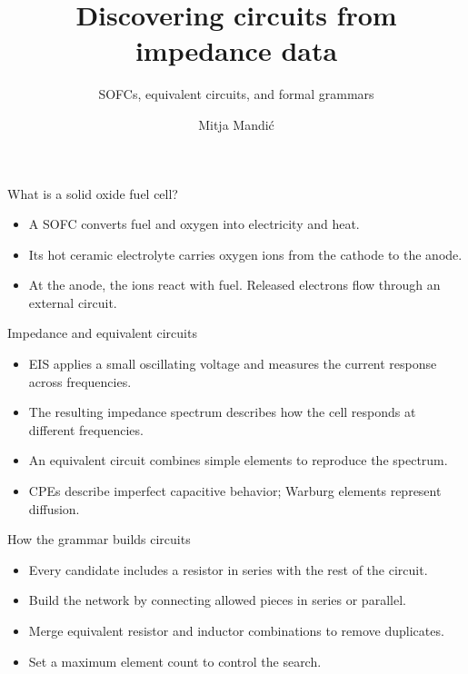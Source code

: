 \documentclass[aspectratio=169,12pt]{beamer}
\title{Discovering circuits from impedance data}
\subtitle{SOFCs, equivalent circuits, and formal grammars}
\author{Mitja Mandić}
\institute{IJS E8}
\date{}
\begin{document}
\begin{frame}[plain]
  \titlepage
\end{frame}

\begin{frame}{What is a solid oxide fuel cell?}
  \begin{itemize}
    \setlength{\itemsep}{0.95em}
    \item A SOFC converts fuel and oxygen into electricity and heat.
    \item Its hot ceramic electrolyte carries oxygen ions from the cathode to the anode.
    \item At the anode, the ions react with fuel. Released electrons flow through an external circuit.
  \end{itemize}
\end{frame}

\begin{frame}{Impedance and equivalent circuits}
  \begin{itemize}
    \setlength{\itemsep}{0.95em}
    \item EIS applies a small oscillating voltage and measures the current response across frequencies.
    \item The resulting impedance spectrum describes how the cell responds at different frequencies.
    \item An equivalent circuit combines simple elements to reproduce the spectrum.
    \item CPEs describe imperfect capacitive behavior; Warburg elements represent diffusion.
  \end{itemize}
\end{frame}

\begin{frame}{How the grammar builds circuits}
  \begin{itemize}
    \setlength{\itemsep}{0.8em}
    \item Every candidate includes a resistor in series with the rest of the circuit.
    \item Build the network by connecting allowed pieces in series or parallel.
    \item Merge equivalent resistor and inductor combinations to remove duplicates.
    \item Set a maximum element count to control the search.
  \end{itemize}
\end{frame}
\end{document}
